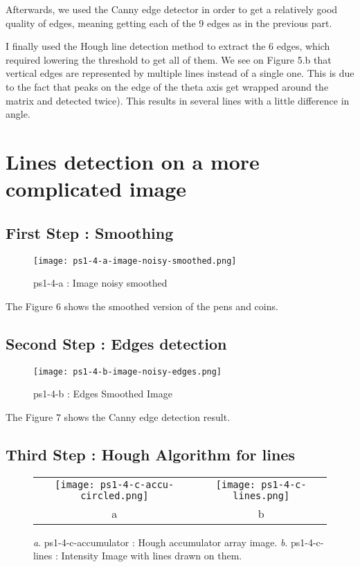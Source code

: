 \documentclass[a4paper,11pt]{article}
\begin{document}
Afterwards, we used the Canny edge detector in order to get a relatively good quality of edges, meaning getting each of the 9 edges as in the previous part.

I finally used the Hough line detection method to extract the 6 edges, which required lowering the threshold to get all of them. We see on Figure 5.b that vertical edges are represented by multiple lines instead of a single one. This is due to the fact that peaks on the edge of the theta axis get wrapped around the matrix and detected twice). This results in several lines with a little difference in angle.

\section{Lines detection on a more complicated image}

\subsection{First Step : Smoothing}

\begin{figure}[H]
\centering
\texttt{[image: ps1-4-a-image-noisy-smoothed.png]}
 \caption{ps1-4-a : Image noisy smoothed }
\label{ps1-4-a}
\end{figure}

The Figure 6 shows the smoothed version of the pens and coins.

\subsection{Second Step : Edges detection}


\begin{figure}[H]
\centering
\texttt{[image: ps1-4-b-image-noisy-edges.png]}
 \caption{ps1-4-b : Edges Smoothed Image }
\label{ps1-4-b}
\end{figure}

The Figure 7 shows the Canny edge detection result.

\subsection{Third Step : Hough Algorithm for lines}

 \begin{figure}[H]
\begin{center}
\begin{tabular}{cc}
\texttt{[image: ps1-4-c-accu-circled.png]}&
\texttt{[image: ps1-4-c-lines.png]}\\
	a&b
\end{tabular}
\end{center}
 \caption{
\textit{a}. ps1-4-c-accumulator : Hough accumulator array image.  \textit{b}. ps1-4-c-lines : Intensity Image with lines drawn on them. }
\label{ps1-4-c}
\end{figure}
\end{document}
